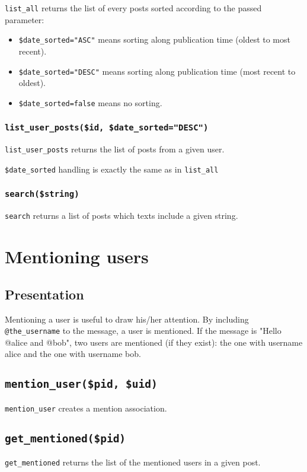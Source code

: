 \documentclass[twoside,a4paper,12pt]{article}
\begin{document}
\texttt{list\_all} returns the list of every posts sorted according to the passed parameter:

\begin{itemize}
\item \texttt{\$date\_sorted="ASC"} means sorting along publication time (oldest to most recent).
\item \texttt{\$date\_sorted="DESC"} means sorting along publication time (most recent to oldest).
\item \texttt{\$date\_sorted=false} means no sorting.
\end{itemize}

\subsubsection{\texttt{list\_user\_posts(\$id, \$date\_sorted="DESC")}}

\texttt{list\_user\_posts} returns the list of posts from a given user.

\texttt{\$date\_sorted} handling is exactly the same as in \texttt{list\_all}

\subsubsection{\texttt{search(\$string)}}

\texttt{search} returns a list of posts which texts include a given string.

\section{Mentioning users}

\subsection{Presentation}

Mentioning a user is useful to draw his/her attention. By including \texttt{@the\_username} to the message, a user is mentioned. If the message is "Hello @alice and @bob", two users are mentioned (if they exist): the one with username alice and the one with username bob.

\subsection{\texttt{mention\_user(\$pid, \$uid)}}
\texttt{mention\_user} creates a mention association.

\subsection{\texttt{get\_mentioned(\$pid)}}
\texttt{get\_mentioned} returns the list of the mentioned users in a given post.
\end{document}
